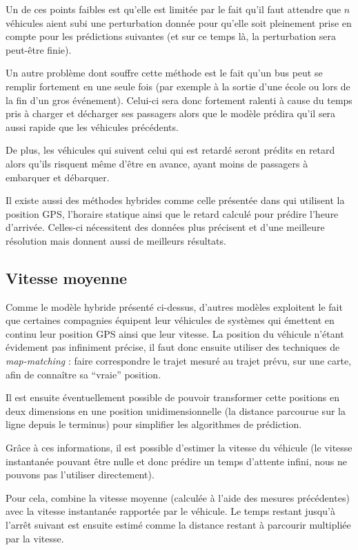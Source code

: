 \documentclass[letterpaper]{article}
\begin{document}
Un de ces points faibles est qu'elle est limitée par le fait qu'il faut attendre que $n$ véhicules aient subi une perturbation donnée pour qu'elle soit pleinement prise en compte pour les prédictions suivantes (et sur ce temps là, la perturbation sera peut-être finie).

Un autre problème dont souffre cette méthode est le fait qu'un bus peut se remplir fortement en une seule fois (par exemple à la sortie d'une école ou lors de la fin d'un gros événement). Celui-ci sera donc fortement ralenti à cause du temps pris à charger et décharger ses passagers alors que le modèle prédira qu'il sera aussi rapide que les véhicules précédents.

De plus, les véhicules qui suivent celui qui est retardé seront prédits en retard alors qu'ils risquent même d'être en avance, ayant moins de passagers à embarquer et débarquer.

Il existe aussi des méthodes hybrides comme celle présentée dans \cite{lin1999experimental} qui utilisent la position GPS, l'horaire statique ainsi que le retard calculé pour prédire l'heure d'arrivée. Celles-ci nécessitent des données plus précisent et d'une meilleure résolution mais donnent aussi de meilleurs résultats.



\subsection{Vitesse moyenne}

Comme le modèle hybride présenté ci-dessus, d'autres modèles exploitent le fait que certaines compagnies équipent leur véhicules de systèmes qui émettent en continu leur position GPS ainsi que leur vitesse. La position du véhicule n'étant évidement pas infiniment précise, il faut donc ensuite utiliser des techniques de \textit{map-matching} : faire correspondre le trajet mesuré au trajet prévu, sur une carte, afin de connaître sa ``vraie'' position.

Il est ensuite éventuellement possible de pouvoir transformer cette positions en deux dimensions en une position unidimensionnelle (la distance parcourue sur la ligne depuis le terminus) pour simplifier les algorithmes de prédiction.

Grâce à ces informations, il est possible d'estimer la vitesse du véhicule (le vitesse instantanée pouvant être nulle et donc prédire un temps d'attente infini, nous ne pouvons pas l'utiliser directement).

Pour cela, \cite{Maciver2002} combine la vitesse moyenne (calculée à l'aide des mesures précédentes) avec la vitesse instantanée rapportée par le véhicule. Le temps restant jusqu'à l'arrêt suivant est ensuite estimé comme la distance restant à parcourir multipliée par la vitesse.
\end{document}
